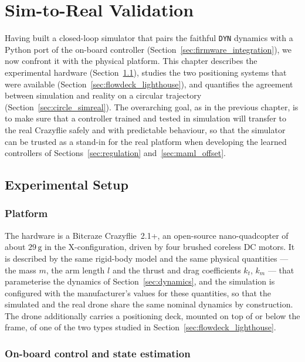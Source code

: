 \documentclass[11pt,a4paper]{article}
\theoremstyle{remark}
\numberwithin{equation}{section}
\begin{document}
\newpage
\section{Sim-to-Real Validation}\label{sec:simreal}

Having built a closed-loop simulator that pairs the faithful \texttt{DYN} dynamics
with a Python port of the on-board controller
(Section~\ref{sec:firmware_integration}), we now confront it with the physical
platform. This chapter describes the experimental hardware
(Section~\ref{sec:exp_setup}), studies the two positioning systems that were
available (Section~\ref{sec:flowdeck_lighthouse}), and quantifies the agreement
between simulation and reality on a circular trajectory
(Section~\ref{sec:circle_simreal}). The overarching goal, as in the previous
chapter, is to make sure that a controller trained and tested in simulation will
transfer to the real Crazyflie safely and with predictable behaviour, so that the
simulator can be trusted as a stand-in for the real platform when developing the
learned controllers of Sections~\ref{sec:regulation} and~\ref{sec:maml_offset}.

\subsection{Experimental Setup}\label{sec:exp_setup}

\subsubsection*{Platform}

The hardware is a Bitcraze Crazyflie~2.1+, an open-source nano-quadcopter of about
$29\,\mathrm{g}$ in the X-configuration, driven by four brushed coreless DC motors.
It is described by the same rigid-body model and the same physical quantities --- the
mass $m$, the arm length $l$ and the thrust and drag coefficients $k_t$, $k_m$ --- that
parameterise the dynamics of Section~\ref{sec:dynamics}, and the simulation is configured
with the manufacturer's values for these quantities, so that the simulated and the real
drone share the same nominal dynamics by construction. The drone additionally carries a
positioning deck, mounted on top of or below the frame, of one of the two types studied
in Section~\ref{sec:flowdeck_lighthouse}.

\subsubsection*{On-board control and state estimation}
\end{document}
